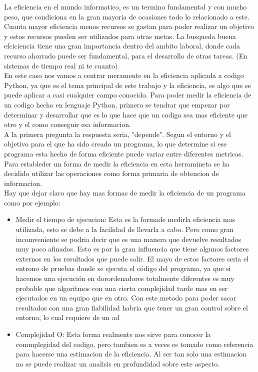 
La eficiencia en el mundo informatico, es un termino fundamental y con mucho peso, que condiciona en la gran mayoria de ocasiones todo lo relacionado a este. Cuanta mayor eficiencia menos recursos se gastan para poder realizar un objetivo y estos recursos pueden ser utilizados para otras metas. 
La busqueda buena efciciencia tiene una gran importancia dentro del ambito laboral, donde cada recurso ahorrado puede ser fundamental, para el desarrollo de otras tareas. (En sistemas  de tiempo real ni te  cuanto)\\

En este caso nos vamos a centrar meramente en la eficiencia aplicada a codigo Python, ya que es el tema principal de este trabajo y la eficiencia, es algo que se puede aplicar a casi cualquier campo conocido. 
Para poder medir la eficiencia de un codigo hecho en lenguaje Python, primero se tendrar que empezar por determinar y desarrollar que es lo que hace que un codigo sea mas eficiente que otro y el como conseguir esa informacion.\\

A la primera pregunta la respuesta seria, "depende". Segun el entorno y el objetivo para el que ha sido creado un programa, lo que determine si ese programa esta hecho de forma eficiente puede variar entre diferentes metricas. Para estableder un forma de medir la eficiencia en esta herramineta se ha decidido utilizar las operaciones como forma primaria de obtencion de informacion.\\ 

Hay que dejar claro que hay mas formas de medir la eficiencia de un programa como por ejemplo:
\begin{itemize}
	\item Medir el tiempo de ejecucion: Esta es la formade medirla eficiencia mas utilizada, esto se debe a la facilidad de llevarla a cabo. Pero como gran incomveniente se podria decir que es una manera que devuelve resultados muy poco afinados. Esto es por la gran influencia que  tiene algunos factores  externos en los resultados que puede salir. El mayo  de estos factores seria el entrono de pruebas donde se ejecuta el código del programa, ya que si hacemos una ejecución en dorordenadores totalmente diferentes es muy probable  que algoritmos con una cierta complejidad  tarde mas en ser ejecutados  en un equipo que en otro. Con este  metodo  para poder sacar resultados con una gran fiabilidad habria que tener un gran control sobre el entorno, lo cual requiere de un ad 
	\item Complejidad O: Esta forma realmente nos sirve  para conocer la commplegidad del codigo, pero tambien es a veces es tomado como referencia para hacerse una estimacion de la eficiencia. Al ser tan solo una estimacion no se puede realizar un analisis en profundidad sobre este aspecto.

\end{itemize}



